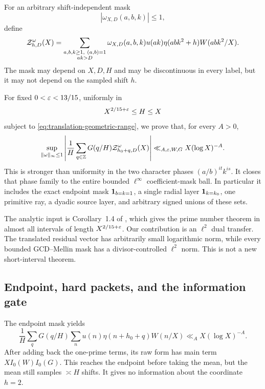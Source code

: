 For an arbitrary shift-independent mask
\begin{equation}
 |\omega_{X,D}(a,b,k)|\leq1,
 \label{eq:bounded-mask}
\end{equation}
define
\begin{equation}
 \mathcal Z_{h,D}^{\omega}(X)=
 \sum_{\substack{a,b,k\geq1,\ (a,b)=1\\ak>D}}
 \omega_{X,D}(a,b,k)u(ak)
 \eta(abk^2+h)W(abk^2/X).
 \label{eq:masked-residual}
\end{equation}
The mask may depend on $X,D,H$ and may be discontinuous in every label, but
it may not depend on the sampled shift $h$.

For fixed $0<\varepsilon<13/15$, uniformly in
\begin{equation}
 X^{2/15+\varepsilon}\leq H\leq X
 \label{eq:short-shift-range}
\end{equation}
subject to \eqref{eq:translation-geometric-range}, we prove that, for every
$A>0$,
\begin{equation}
 \sup_{\|\omega\|_\infty\leq1}
 \left|
 \frac1H\sum_{q\in\mathbb Z}G(q/H)
 \mathcal Z_{h_0+q,D}^{\omega}(X)
 \right|
 \ll_{A,\varepsilon,W,G}X(\log X)^{-A}.
 \label{eq:intro-mask-theorem}
\end{equation}
This is stronger than uniformity in the two character phases
$(a/b)^{it}k^{is}$.  It closes that phase family to the entire bounded
$\ell^\infty$ coefficient-mask ball.  In particular it includes the exact endpoint mask
$\mathbf 1_{b=k=1}$, a single radial layer $\mathbf 1_{k=k_0}$, one primitive ray,
a dyadic source layer, and arbitrary signed unions of these sets.

The analytic input is Corollary~1.4 of \citet{GuthMaynard2026}, which gives
the prime number theorem in almost all intervals of length
$X^{2/15+\varepsilon}$.  Our contribution is an $\ell^2$ dual transfer.  The
translated residual vector has arbitrarily small logarithmic norm, while
every bounded GCD--Mellin mask has a divisor-controlled $\ell^2$ norm.
This is not a new short-interval theorem.

\subsection{Endpoint, hard packets, and the information gate}

The endpoint mask yields
\begin{equation}
 \frac1H\sum_qG(q/H)
 \sum_n u(n)\eta(n+h_0+q)W(n/X)
 \ll_A X(\log X)^{-A}.
 \label{eq:intro-endpoint-covariance}
\end{equation}
After adding back the one-prime terms, its raw form has main term
$XI_0(W)I_0(G)$.  This reaches the endpoint before taking the mean, but the
mean still samples $\asymp H$ shifts.  It gives no information about the
coordinate $h=2$.

